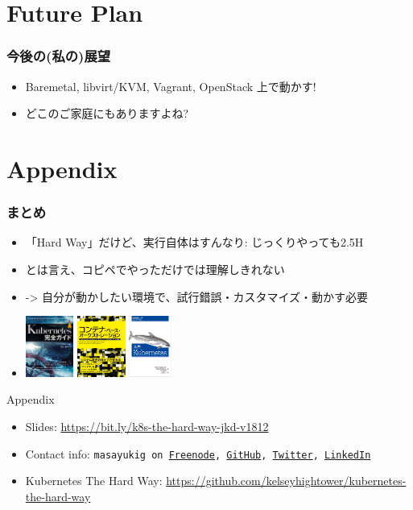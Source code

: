 \documentclass[aspectratio=169,11pt,hyperref={colorlinks=true}]{beamer}
\begin{document}
\section{Future Plan}
\begin{frame}
  \frametitle{今後の(私の)展望}
  \begin{itemize}
    \item Baremetal, libvirt/KVM, Vagrant, OpenStack 上で動かす!
    \item[] どこのご家庭にもありますよね?
  \end{itemize}
\end{frame}

\section{Appendix}
\begin{frame}
  \frametitle{まとめ}
  \begin{itemize}
    \item 「Hard Way」だけど、実行自体はすんなり: じっくりやっても2.5H
    \item とは言え、コピペでやっただけでは理解しきれない
    \item[] -> 自分が動かしたい環境で、試行錯誤・カスタマイズ・動かす必要
    \item[] \includegraphics[height=20mm]{images/kubernetes_complete_guide.jpg}
       \includegraphics[height=20mm]{images/container_based_orchestration.jpg}
       \includegraphics[height=20mm]{images/kubernetes_up_and_running.jpeg}
  \end{itemize}
  Appendix
  \begin{itemize}
      \item Slides: \url{https://bit.ly/k8s-the-hard-way-jkd-v1812}
      \item Contact info: \texttt{masayukig on
        \href{https://freenode.net/}{Freenode},
        \href{https://github.com/masayukig}{GitHub},
        \href{https://twitter.com/masayukig}{Twitter},
        \href{https://www.linkedin.com/in/masayukig/}{LinkedIn}}
      \item Kubernetes The Hard Way: \url{https://github.com/kelseyhightower/kubernetes-the-hard-way}
  \end{itemize}
\end{frame}
\end{document}
